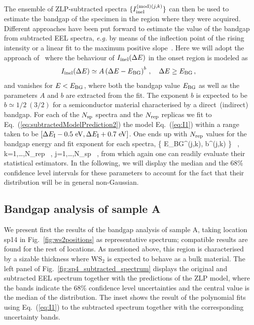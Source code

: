  The ensemble of ZLP-subtracted spectra $\{I_{\rm inel}^{({\rm mod})(j,k)} \} $
 can then be used to estimate the bandgap of the specimen in the region where
 they were acquired.
 Different approaches  have been put forward to estimate the value of the bandgap from 
subtracted EEL spectra, \textit{e.g.} by means of the inflection point of the rising intensity or
a linear fit to the maximum positive slope~\cite{Schamm:2003}.
%
Here we will adopt the approach of~\cite{Rafferty:2000} where the behaviour
of $I_{\rm inel}(\Delta E)$ in the onset region is modeled as
\begin{equation}
  \label{eq:I1}
    I_{\rm inel}(\Delta E) \simeq  A \left( \Delta E-E_{\rm BG} \right)^{b} \, , \quad \Delta E \ge E_{\rm BG} \, ,
\end{equation}
and vanishes for $E < E_{\rm BG}$, where both the bandgap value
$E_{\rm BG}$ as well as the parameters $A$ and $b$ are extracted from the fit.
%
The exponent $b$ is expected to be $b\simeq 1/2~(3/2)$ for a semiconductor material characterised
by a direct~(indirect) bandgap.
 For each of the $N_{\rm sp}$ spectra and the $N_{\rm rep}$ replicas
 we fit to Eq.~(\ref{eq:subtractedModelPrediction2}) the model Eq.~(\ref{eq:I1})
 within a range taken to be
 $\left[ \Delta E_{\rm I} - 0.5~{\rm eV}, \Delta E_{\rm I} + 0.7~{\rm eV}\right]$.
 One ends up with $N_{\rm rep}$ values for
 the bandgap energy and fit exponent for each spectra,
 \be
 \Big \{ E_{\rm BG}^{(j,k)}, b^{(j,k)} \Big\} \, , \quad k=1,\ldots,N_{\rm rep} \, ,
 \quad j=1,\ldots,N_{\rm sp} \, ,
 \ee
 from which again one can readily evaluate their statistical estimators.
 In the following, we will display the median and the 68\% confidence level intervals
 for these parameters to account for the fact that their distribution will be in general non-Gaussian.

 \subsection{Bandgap analysis of sample A}

We present first the results of the bandgap analysis of sample A,
taking location sp14 in Fig.~\ref{fig:ws2positions} as representative spectrum; compatible results
are found for the rest of locations.
%
As mentioned above, this region is characterised by a sizable thickness where
WS$_2$ is expected to behave as a bulk material.
%
The left panel of Fig.~\ref{fig:sp4_subtracted_spectrum} displays the original
and subtracted EEL spectrum
together with the predictions of the ZLP model, where
the bands indicate the 68\% confidence level uncertainties and the central value
is the median of the distribution.
%
The inset shows the result of the polynomial fits using Eq.~(\ref{eq:I1}) to the subtracted spectrum
together with the corresponding uncertainty bands.


